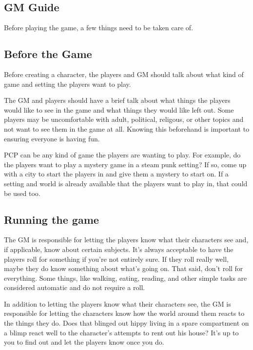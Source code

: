 \begin{flushleft}

\chapter{GM Guide}

Before playing the game, a few things need to be taken care of.

\section{Before the Game}

Before creating a character, the players and GM should talk about what kind of
game and setting the players want to play.

The GM and players should have a brief talk about what things the players
would like to see in the game and what things they would like left out.
Some players may be uncomfortable with adult, political, religous, or other
topics and not want to see them in the game at all. Knowing this beforehand
is important to ensuring everyone is having fun.

PCP can be any kind of game the players are wanting to play. For example, do
the players want to play a mystery game in a steam punk setting? If so, come up
with a city to start the players in and give them a mystery to start on.
If a setting and world is already available that the players want to play in,
that could be used too.

\section{Running the game}

The GM is responsible for letting the players know what their characters see
and, if applicable, know about certain subjects. It's always acceptable to
have the players roll for something if you're not entirely sure. If they roll
really well, maybe they do know something about what's going on. That said,
don't roll for everything. Some things, like walking, eating, reading, and
other simple tasks are considered automatic and do not require a roll.

In addition to letting the players know what their characters see, the GM is
responsible for letting the characters know how the world around them reacts
to the things they do. Does that blinged out hippy living in a spare
compartment on a blimp react well to the character's attempts to rent out his
house? It's up to you to find out and let the players know once you do.


\end{flushleft}
